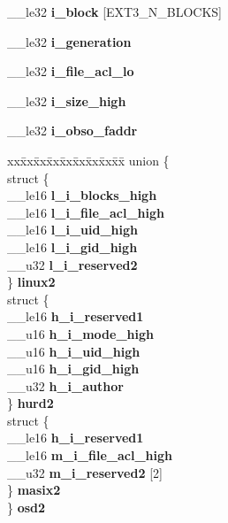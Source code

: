 \begin{DoxyCompactItemize}
\begin{tabbing}
\end{tabbing}\item 
\mbox{\label{structext3__inode_a4771fcb6a0adc723924473ebbb6cd63c}} 
\+\_\+\+\_\+le32 {\bfseries i\+\_\+block} \mbox{[}E\+X\+T3\+\_\+\+N\+\_\+\+B\+L\+O\+C\+KS\mbox{]}
\item 
\mbox{\label{structext3__inode_a20cb4065b0fe54741659a5b89cd1c082}} 
\+\_\+\+\_\+le32 {\bfseries i\+\_\+generation}
\item 
\mbox{\label{structext3__inode_aa8b86b8ac796512cfe66826d16e871d9}} 
\+\_\+\+\_\+le32 {\bfseries i\+\_\+file\+\_\+acl\+\_\+lo}
\item 
\mbox{\label{structext3__inode_ae0ffbd5c268be37a6c493e3c5dd76cb5}} 
\+\_\+\+\_\+le32 {\bfseries i\+\_\+size\+\_\+high}
\item 
\mbox{\label{structext3__inode_ae10b9fde075ff8b763d0dfd4cff7edde}} 
\+\_\+\+\_\+le32 {\bfseries i\+\_\+obso\+\_\+faddr}
\item 
\mbox{\label{structext3__inode_aee92ea7dc39dab9497f711ef32f404a7}} 
\begin{tabbing}
xx\=xx\=xx\=xx\=xx\=xx\=xx\=xx\=xx\=\kill
union \{\\
\>struct \{\\
\>\>\_\_le16 {\bfseries l\_i\_blocks\_high}\\
\>\>\_\_le16 {\bfseries l\_i\_file\_acl\_high}\\
\>\>\_\_le16 {\bfseries l\_i\_uid\_high}\\
\>\>\_\_le16 {\bfseries l\_i\_gid\_high}\\
\>\>\_\_u32 {\bfseries l\_i\_reserved2}\\
\>\} {\bfseries linux2}\\
\>struct \{\\
\>\>\_\_le16 {\bfseries h\_i\_reserved1}\\
\>\>\_\_u16 {\bfseries h\_i\_mode\_high}\\
\>\>\_\_u16 {\bfseries h\_i\_uid\_high}\\
\>\>\_\_u16 {\bfseries h\_i\_gid\_high}\\
\>\>\_\_u32 {\bfseries h\_i\_author}\\
\>\} {\bfseries hurd2}\\
\>struct \{\\
\>\>\_\_le16 {\bfseries h\_i\_reserved1}\\
\>\>\_\_le16 {\bfseries m\_i\_file\_acl\_high}\\
\>\>\_\_u32 {\bfseries m\_i\_reserved2} \mbox{[}2\mbox{]}\\
\>\} {\bfseries masix2}\\
\} {\bfseries osd2}\\


\end{tabbing}
\end{DoxyCompactItemize}
